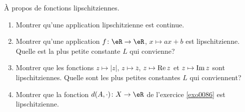 
\begin{exercice}\label{exo0087}

  À propos de fonctions lipschitziennes.
\begin{enumerate}
\item
Montrer qu'une application lipschitzienne est continue.

\item
Montrer qu'une application $f \colon \eR \to \eR$, $x \mapsto ax+b$ est lipschitzienne.  Quelle est la plus petite constante $L$ qui convienne?

\item
 Montrer que les fonctions $z \mapsto |z|$, $z \mapsto \overline z$, $z \mapsto {\rm Re\,} z$ et $z \mapsto {\rm Im\,} z$ sont lipschitziennes.  Quelle sont les plus petites constantes $L$ qui conviennent?

\item 
Montrer que la fonction $d(A,\cdot)\colon X \to \eR$ de l'exercice \ref{exo0086} est lipschitzienne.

\end{enumerate}

\end{exercice}
